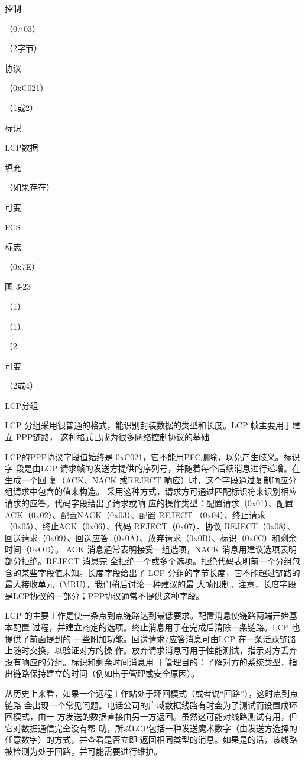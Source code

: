 控制

（0×03）

（2字节）

协议

（0xC021）

（1或2）

标识

LCP数据

填充

（如果存在）

可变

FCS

标志

（0x7E）

图 3-23

（1）

（1）

（2

可变

（2或4）

LCP分组

LCP 分组采用很普通的格式，能识别封装数据的类型和长度。LCP 帧主要用于建立 PPP链路，
这种格式已成为很多网络控制协议的基础

LCP的PPP协议字段值始终是 0xC021，它不能用PFC删除，以免产生歧义。标识字
段是由LCP 请求帧的发送方提供的序列号，并随着每个后续消息进行递增。在生成一个回
复（ACK、NACK 或REJECT 响应）时，这个字段通过复制响应分组请求中包含的值来构造。
采用这种方式，请求方可通过匹配标识符来识别相应请求的应答。代码字段给出了请求或响
应的操作类型：配置请求（0x01）、配置ACK（0x02）、配置NACK（0x03）、配置 REJECT
（0x04）、终止请求（0x05）、终止ACK（0x06）、代码 REJECT（0x07）、协议 REJECT（0x08）、
回送请求（0x09）、回送应答（0x0A）、放弃请求（0x0B）、标识（0x0C）和剩余时间（0xOD）。
ACK 消息通常表明接受一组选项，NACK 消息用建议选项表明部分拒绝。REJECT 消息完
全拒绝一个或多个选项。拒绝代码表明前一个分组包含的某些字段值未知。长度字段给出了
LCP 分组的字节长度，它不能超过链路的最大接收单元（MRU），我们稍后讨论一种建议的最
大帧限制。注意，长度字段是LCP协议的一部分；PPP协议通常不提供这种字段。

LCP 的主要工作是使一条点到点链路达到最低要求。配置消息使链路两端开始基本配置
过程，并建立商定的选项。终止消息用于在完成后清除一条链路。LCP 也提供了前面提到的
一些附加功能。回送请求/应答消息可由LCP 在一条活跃链路上随时交换，以验证对方的操
作。放弃请求消息可用于性能测试，指示对方丢弃没有响应的分组。标识和剩余时间消息用
于管理目的：了解对方的系统类型，指出链路保持建立的时间（例如出于管理或安全原因）。

从历史上来看，如果一个远程工作站处于环回模式（或者说“回路”），这时点到点链路
会出现一个常见问题。电话公司的广域数据线路有时会为了测试而设置成环回模式，由一
方发送的数据直接由另一方返回。虽然这可能对线路测试有用，但它对数据通信完全没有帮
助，所以LCP包括一种发送魔术数字（由发送方选择的任意数字）的方式，并查看是否立即
返回相同类型的消息。如果是的话，该线路被检测为处于回路，并可能需要进行维护。

